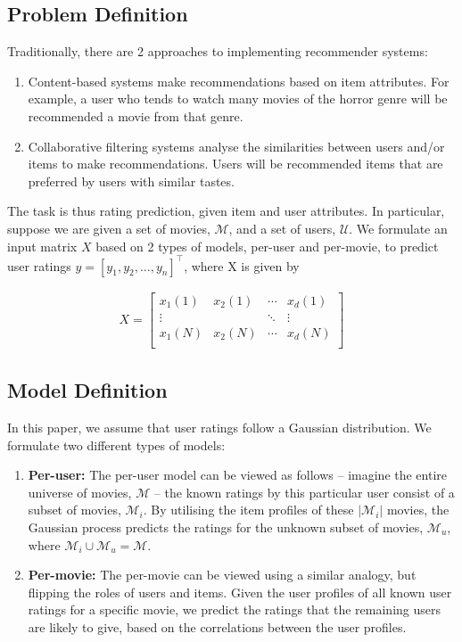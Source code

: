 \documentclass[letterpaper]{article}
\begin{document}
\subsection{Problem Definition}
Traditionally, there are 2 approaches to implementing recommender systems:

\begin{enumerate}
	\item Content-based systems make recommendations based on item attributes. For example, a user who tends to watch many movies of the horror genre will be recommended a movie from that genre.
	\item Collaborative filtering systems analyse the similarities between users and/or items to make recommendations. Users will be recommended items that are preferred by users with similar tastes.
\end{enumerate}

The task is thus rating prediction, given item and user attributes. In particular, suppose we are given a set of movies, $\mathcal{M}$, and a set of users, $\mathcal{U}$. We formulate an input matrix $X$ based on 2 types of models, per-user and per-movie, to predict user ratings $y = [y_1, y_2, \ldots, y_n]^\top$, where X is given by

\begin{align*}
	X = \begin{bmatrix}
	x_1(1) & x_2(1) & \cdots & x_d(1)\\
	\vdots & & \ddots & \vdots \\
	x_1(N) & x_2(N) & \cdots & x_d(N) \\
	\end{bmatrix}
\end{align*}
\subsection{Model Definition}
In this paper, we assume that user ratings follow a Gaussian distribution. We formulate two different types of models:

\begin{enumerate}
	\item \textbf{Per-user:} The per-user model can be viewed as follows -- imagine the entire universe of movies, $\mathcal{M}$ -- the known ratings by this particular user consist of a subset of movies, $\mathcal{M}_i$. By utilising the item profiles of these $\vert \mathcal{M}_i \vert$ movies, the Gaussian process predicts the ratings for the unknown subset of movies, $\mathcal{M}_u$, where $\mathcal{M}_i \cup \mathcal{M}_u = \mathcal{M}$.
	\item \textbf{Per-movie:} The per-movie can be viewed using a similar analogy, but flipping the roles of users and items. Given the user profiles of all known user ratings for a specific movie, we predict the ratings that the remaining users are likely to give, based on the correlations between the user profiles.
\end{enumerate}
\end{document}

